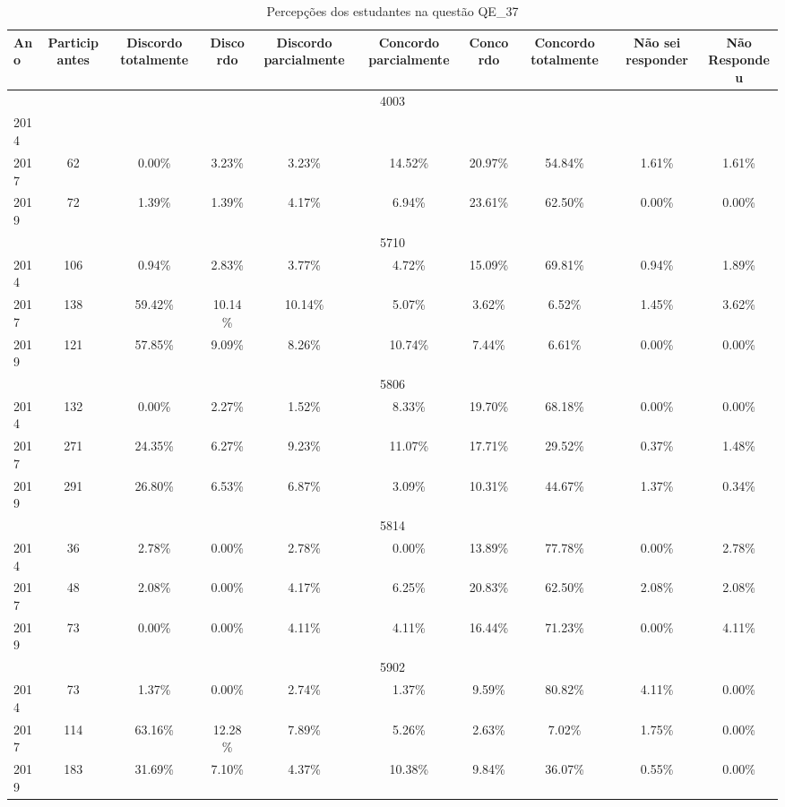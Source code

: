 \begin{table}[H]
\centering
\caption{Percepções dos estudantes na questão QE\_37}
\begin{tabular}{|l|c|ccc|ccc|cc|}
\hline
\toprule
Ano & Participantes & Discordo totalmente & Discordo & Discordo parcialmente & Concordo parcialmente & Concordo & Concordo totalmente & Não sei responder & Não Respondeu \\
\midrule
\hline
\multicolumn{10}{|c|}{4003}\\
\hline
2014 & & & & & & & & & \\
2017 & 62 & 0.00\% & 3.23\% & 3.23\% & 14.52\% & 20.97\% & 54.84\% & 1.61\% & 1.61\%\\
2019 & 72 & 1.39\% & 1.39\% & 4.17\% & 6.94\% & 23.61\% & 62.50\% & 0.00\% & 0.00\%\\
\hline
\hline
\multicolumn{10}{|c|}{5710}\\
\hline
2014 & 106 & 0.94\% & 2.83\% & 3.77\% & 4.72\% & 15.09\% & 69.81\% & 0.94\% & 1.89\%\\
2017 & 138 & 59.42\% & 10.14\% & 10.14\% & 5.07\% & 3.62\% & 6.52\% & 1.45\% & 3.62\%\\
2019 & 121 & 57.85\% & 9.09\% & 8.26\% & 10.74\% & 7.44\% & 6.61\% & 0.00\% & 0.00\%\\
\hline
\hline
\multicolumn{10}{|c|}{5806}\\
\hline
2014 & 132 & 0.00\% & 2.27\% & 1.52\% & 8.33\% & 19.70\% & 68.18\% & 0.00\% & 0.00\%\\
2017 & 271 & 24.35\% & 6.27\% & 9.23\% & 11.07\% & 17.71\% & 29.52\% & 0.37\% & 1.48\%\\
2019 & 291 & 26.80\% & 6.53\% & 6.87\% & 3.09\% & 10.31\% & 44.67\% & 1.37\% & 0.34\%\\
\hline
\hline
\multicolumn{10}{|c|}{5814}\\
\hline
2014 & 36 & 2.78\% & 0.00\% & 2.78\% & 0.00\% & 13.89\% & 77.78\% & 0.00\% & 2.78\%\\
2017 & 48 & 2.08\% & 0.00\% & 4.17\% & 6.25\% & 20.83\% & 62.50\% & 2.08\% & 2.08\%\\
2019 & 73 & 0.00\% & 0.00\% & 4.11\% & 4.11\% & 16.44\% & 71.23\% & 0.00\% & 4.11\%\\
\hline
\hline
\multicolumn{10}{|c|}{5902}\\
\hline
2014 & 73 & 1.37\% & 0.00\% & 2.74\% & 1.37\% & 9.59\% & 80.82\% & 4.11\% & 0.00\%\\
2017 & 114 & 63.16\% & 12.28\% & 7.89\% & 5.26\% & 2.63\% & 7.02\% & 1.75\% & 0.00\%\\
2019 & 183 & 31.69\% & 7.10\% & 4.37\% & 10.38\% & 9.84\% & 36.07\% & 0.55\% & 0.00\%\\

\end{tabular}
\end{table}
